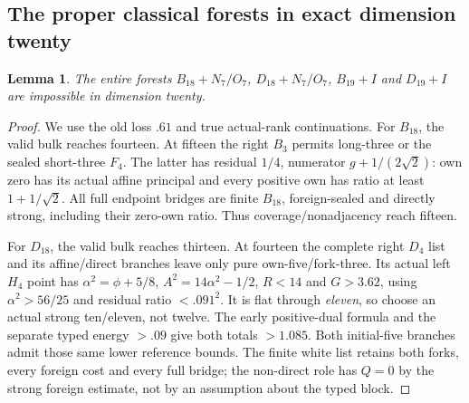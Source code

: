 \documentclass[11pt]{article}
\newtheorem{lemma}[theorem]{Lemma}
\theoremstyle{definition}
\theoremstyle{remark}
\begin{document}
\subsection{The proper classical forests in exact dimension twenty}
\label{app:tail:proper20classical}
\begin{lemma}
\label{app:tail:lem:proper20classical}
The entire forests $B_{18}+N_7/O_7$, $D_{18}+N_7/O_7$,
$B_{19}+I$ and $D_{19}+I$ are impossible in dimension twenty.
\end{lemma}
\begin{proof}
We use the old loss $.61$ and true actual-rank continuations.
For $B_{18}$, the valid bulk reaches fourteen. At fifteen the
right $B_3$ permits long-three or the sealed short-three $F_4$.
The latter has residual $1/4$, numerator $g+1/(2\sqrt2)$:
own zero has its actual affine principal and every positive own
has ratio at least $1+1/\sqrt2$. All full endpoint bridges are
finite $B_{18}$, foreign-sealed and directly strong, including
their zero-own ratio. Thus coverage/nonadjacency reach fifteen.

For $D_{18}$, the valid bulk reaches thirteen. At fourteen the
complete right $D_4$ list and its affine/direct branches leave
only pure own-five/fork-three. Its actual left $H_4$ point has
$\alpha^2=\phi+5/8$, $A^2=14\alpha^2-1/2$, $R<14$ and
$G>3.62$, using $\alpha^2>56/25$ and residual ratio $<.091^2$.
It is flat through \emph{eleven}, so choose an actual strong
ten/eleven, not twelve. The early positive-dual formula and the
separate typed energy $>.09$ give both totals $>1.085$.
Both initial-five branches admit those same lower reference bounds.
The finite white list retains both forks, every foreign cost and
every full bridge; the non-direct role has $Q=0$ by the strong
foreign estimate, not by an assumption about the typed block.


\end{proof}
\end{document}
